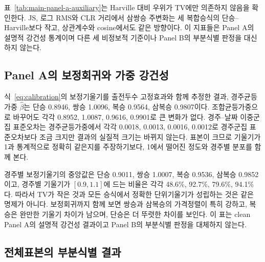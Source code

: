 표~\ref{tab:main-panel-a-auxiliary}는 Harville 대비 우위가 TV에만 의존하지
않음을 확인한다. JS, 로그 RMS와 CLR 거리에서 삼쌍승 주변화는 세 복합승식의
단승--Harville보다 작고, 상관계수와 cosine에서도 같은 방향이다. 이 지표들은
Panel A의 설명적 강건성 통계이며 다른 세 비정보적 기준이나 Panel B의
부분식별 판정을 대신하지 않는다.

\subsection{Panel A의 보정회귀와 가중 강건성}

\begin{table}[htbp]
\centering
\caption{Panel A 보정회귀와 가중·군집 강건성}
\label{tab:main-calibration}
\resizebox{\textwidth}{!}{}
\end{table}

식~\eqref{eq:calibration}의 보정기울기를 출전두수 고정효과와 함께 추정한 결과,
경주균등가중 $\hat\beta$는 단승 0.8946, 쌍승 1.0096, 복승 0.9564,
삼복승 0.9807이다. 조합균등가중으로 바꾸어도 각각 0.8952, 1.0087,
0.9616, 0.9901로 큰 변화가 없다. 경주--날짜 이중군집 표준오차는
경주균등가중에서 각각 0.0018, 0.0013, 0.0016, 0.0012로 경주군집
표준오차보다 조금 크지만 결과의 실질적 크기는 바뀌지 않는다. 표본이 크므로
기울기가 1과 통계적으로 정확히 같은지를 주장하기보다, 1에서 떨어진 정도와
경주별 분포를 함께 본다.

경주별 보정기울기의 중앙값은 단승 0.9011, 쌍승 1.0007, 복승 0.9536,
삼복승 0.9852이고, 경주별 기울기가 $[0.9,1.1]$에 드는 비율은 각각
48.6\%, 92.7\%, 79.6\%, 94.1\%다. 따라서 TV가 작은 것과 모든 승식에서
정확한 단위기울기가 성립하는 것은 같은 명제가 아니다. 보정회귀까지 함께 보면
쌍승과 삼복승의 가격정렬이 특히 강하고, 복승은 완만한 기울기 차이가 남으며,
단승은 더 뚜렷한 차이를 보인다. 이 표는 clean Panel A의 설명적 강건성 결과이고
Panel B의 부분식별 판정을 대체하지 않는다.

\subsection{전체표본의 부분식별 결과}

\begin{table}[htbp]
\centering
\caption{Panel B: 전체표본의 TV 부분식별 경계. 주모형·순열·타경주 기준은
게시 배당의 허용 가격집합을 유지하지만, Harville은 게시 단승 점벡터에서
계산한 퇴화한 점예측을 사용하므로 Harville 비교는 대칭적인 부분식별이 아니다.}
\label{tab:main-panel-b}
\resizebox{\textwidth}{!}{}
\end{table}

